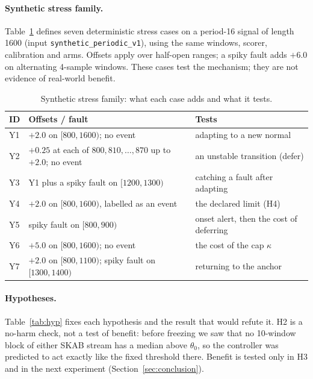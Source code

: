 \paragraph{Synthetic stress family.}
Table~\ref{tab:synthetic-family} defines seven deterministic stress cases on a period-16
signal of length 1600 (input \texttt{synthetic\_\allowbreak periodic\_\allowbreak v1}),
using the same windows, scorer, calibration and arms. Offsets apply over half-open
ranges; a spiky fault adds $+6.0$ on alternating 4-sample windows. These cases test the
mechanism; they are not evidence of real-world benefit.

\begin{table}[H]
  \centering
  \caption{Synthetic stress family: what each case adds and what it tests.}
  \label{tab:synthetic-family}
  \small
  \begin{tabularx}{\linewidth}{@{}llX@{}}
    \toprule
    ID & Offsets / fault & Tests\\
    \midrule
    Y1 & $+2.0$ on $[800,1600)$; no event & adapting to a new normal\\
    Y2 & $+0.25$ at each of $800,810,\dots,870$ up to $+2.0$; no event & an unstable transition (defer)\\
    Y3 & Y1 plus a spiky fault on $[1200,1300)$ & catching a fault after adapting\\
    Y4 & $+2.0$ on $[800,1600)$, labelled as an event & the declared limit (H4)\\
    Y5 & spiky fault on $[800,900)$ & onset alert, then the cost of deferring\\
    Y6 & $+5.0$ on $[800,1600)$; no event & the cost of the cap $\kappa$\\
    Y7 & $+2.0$ on $[800,1100)$; spiky fault on $[1300,1400)$ & returning to the anchor\\
    \bottomrule
  \end{tabularx}
\end{table}

\paragraph{Hypotheses.}
Table~\ref{tab:hyp} fixes each hypothesis and the result that would refute it. H2 is a
no-harm check, not a test of benefit: before freezing we saw that no 10-window block of
either SKAB stream has a median above $\theta_0$, so the controller was predicted to act
exactly like the fixed threshold there. Benefit is tested only in H3 and in the next
experiment (Section~\ref{sec:conclusion}).

